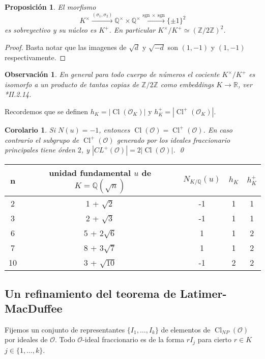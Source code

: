 \documentclass[11pt,a4paper]{amsart}
\newcommand{\R}{\mathbb{R}}
\newcommand{\Q}{\mathbb{Q}}
\newcommand{\Z}{\mathbb{Z}}
\newcommand{\xto}{\xrightarrow}
\DeclareMathOperator{\CL}{Cl}
\numberwithin{equation}{section}
\theoremstyle{plain}
\newtheorem{prop}[equation]{Proposición}
\newtheorem{obs}[equation]{Observación}
\newtheorem{coro}[equation]{Corolario}
\renewcommand{\O}{\mathcal{O}}
\begin{document}
\begin{prop} El morfismo
\[
K^\times \xto{(\sigma_1,\sigma_2)}
\Q^\times \times \Q^\times \xto{\mathrm{sgn} \ \times \ \mathrm{sgn}} \{\pm 1\}^2
\]
es sobreyectivo y su núcleo es $K^+$.
En particular $K^\times/K^+ \simeq (\Z/2\Z)^2$.
\end{prop}
\begin{proof} Basta notar que las imagenes de $\sqrt{d}$ y $\sqrt{-d}$
son $(1,-1)$ y $(1,-1)$ respectivamente.
\end{proof}

\begin{obs} En general para todo cuerpo de números
el cociente $K^\times / K^+$ es isomorfo a un producto
de tantas copias de $\Z/2\Z$ como embeddings $K \to \R$,
ver \cite{ft}*{II.2.14}.
\end{obs}

Recordemos que se definen
$h_K = |\CL(\O_K)|$ y $h_K^+ = |\CL^+(\O_K)|$.

\begin{coro} Si $N(u) = -1$, entonces $\CL(\O) = \CL^+(\O)$. En caso
contrario el subgrupo de $\CL^+(\O)$ generado por los ideales
fraccionario principales tiene órden $2$, y
$|CL^+(\O)| = 2|\CL(\O)|$.
\qed
\end{coro}

\begin{center}
\begin{tabular}{c | c | c | c | c}
n &  unidad fundamental $u$ de $K = \Q(\sqrt{n})$ & $N_{K/\Q}(u)$ & $h_K$ & $h_K^+$\\
\hline
2 & 1 + $\sqrt{2}$ & -1 & 1 & 1 \\
\hline
3 & 2 + $\sqrt{3}$ & -1 & 1 & 1 \\
\hline
6 & 5 + 2$\sqrt{6}$ & 1 & 1 & 2 \\
\hline
7 & 8 + 3$\sqrt{7}$ & 1 & 1 & 2 \\
\hline
10 & 3 + $\sqrt{10}$ & -1 & 2 & 2 \\
\end{tabular}
\end{center}

\subsection{Un refinamiento del teorema de Latimer-MacDuffee}

Fijemos un conjunto de representantes $\{I_1,\ldots, I_k\}$ de
elementos de $\CL_{NP}(\O)$ por ideales de $\O$. Todo $\O$-ideal fraccionario
es de la forma $r I_j$ para cierto $r \in K$ $j \in \{1,\ldots,k\}$.
\end{document}
